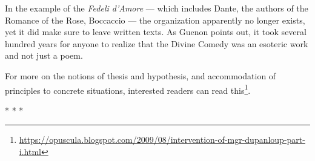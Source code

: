 In the example of the \emph{Fedeli d'Amore} --- which includes Dante, the authors of the Romance of the Rose, Boccaccio --- the organization apparently no longer exists, yet it did make sure to leave written texts. As Guenon points out, it took several hundred years for anyone to realize that the Divine Comedy was an esoteric work and not just a poem.

For more on the notions of thesis and hypothesis, and accommodation of principles to concrete situations, interested readers can read this\footnote{\url{https://opuscula.blogspot.com/2009/08/intervention-of-mgr-dupanloup-part-i.html}}.



\begin{center}* * *\end{center}

